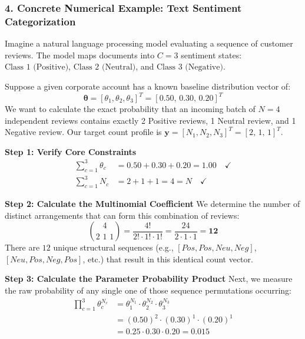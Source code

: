\documentclass{article}
\begin{document}
\subsubsection*{4. Concrete Numerical Example: Text Sentiment Categorization}
Imagine a natural language processing model evaluating a sequence of customer reviews. The model maps documents into $C=3$ sentiment states: $\text{Class 1 (Positive)}$, $\text{Class 2 (Neutral)}$, and $\text{Class 3 (Negative)}$. 

Suppose a given corporate account has a known baseline distribution vector of:
\begin{equation}
    \bm{\theta} = [\theta_1, \theta_2, \theta_3]^T = [0.50, \, 0.30, \, 0.20]^T
\end{equation}
We want to calculate the exact probability that an incoming batch of $N = 4$ independent reviews contains exactly 2 Positive reviews, 1 Neutral review, and 1 Negative review. Our target count profile is $\bm{y} = [N_1, N_2, N_3]^T = [2, \, 1, \, 1]^T$.

\noindent \textbf{Step 1: Verify Core Constraints}
\begin{align}
    \sum_{c=1}^3 \theta_c &= 0.50 + 0.30 + 0.20 = 1.00 \quad \checkmark \\
    \sum_{c=1}^3 N_c &= 2 + 1 + 1 = 4 = N \quad \checkmark
\end{align}

\noindent \textbf{Step 2: Calculate the Multinomial Coefficient}
We determine the number of distinct arrangements that can form this combination of reviews:
\begin{equation}
    \binom{4}{2 \,\, 1 \,\, 1} = \frac{4!}{2! \cdot 1! \cdot 1!} = \frac{24}{2 \cdot 1 \cdot 1} = \mathbf{12}
\end{equation}
There are $12$ unique structural sequences (e.g., $[Pos, Pos, Neu, Neg]$, $[Neu, Pos, Neg, Pos]$, etc.) that result in this identical count vector.

\noindent \textbf{Step 3: Calculate the Parameter Probability Product}
Next, we measure the raw probability of any single one of those sequence permutations occurring:
\begin{align}
    \prod_{c=1}^3 \theta_c^{N_c} &= \theta_1^{N_1} \cdot \theta_2^{N_2} \cdot \theta_3^{N_3} \\
    &= (0.50)^2 \cdot (0.30)^1 \cdot (0.20)^1 \\
    &= 0.25 \cdot 0.30 \cdot 0.20 = \mathbf{0.015}
\end{align}
\end{document}
